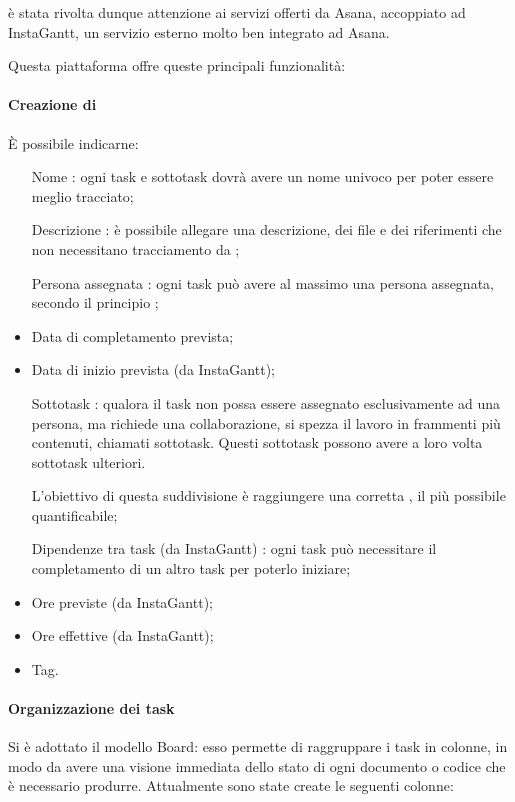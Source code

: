 è stata rivolta dunque attenzione ai servizi offerti da Asana, accoppiato ad InstaGantt, un servizio esterno molto ben integrato ad Asana.

Questa piattaforma offre queste principali funzionalità:
\paragraph{Creazione di } 
È possibile indicarne:
\begin{itemize}
\item [Nome]: ogni task e sottotask dovrà avere un nome univoco per poter essere meglio tracciato;
\item [Descrizione]: è possibile allegare una descrizione, dei file e dei riferimenti che non necessitano tracciamento da ;
\item [Persona assegnata]: ogni task può avere al massimo una persona assegnata, secondo il principio ;
\item Data di completamento prevista;
\item Data di inizio prevista (da InstaGantt);
\item [Sottotask]: qualora il task non possa essere assegnato esclusivamente ad una persona, ma richiede una collaborazione, si spezza il lavoro in frammenti più contenuti, chiamati sottotask. Questi sottotask possono avere a loro volta sottotask ulteriori.

L'obiettivo di questa suddivisione è raggiungere una corretta , il più possibile quantificabile;
\item [Dipendenze tra task (da InstaGantt)]: ogni task può necessitare il completamento di un altro task per poterlo iniziare;
\item Ore previste (da InstaGantt);
\item Ore effettive (da InstaGantt);
\item Tag.
\end{itemize}

\paragraph{Organizzazione dei task} Si è adottato il modello Board: esso permette di raggruppare i task in colonne, in modo da avere una visione immediata dello stato di ogni documento o codice che è necessario produrre.
Attualmente sono state create le seguenti colonne:

